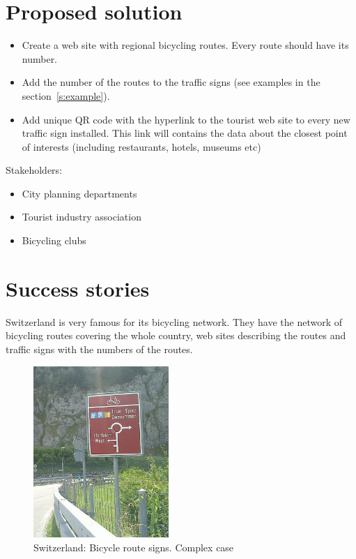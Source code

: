 \documentclass[a4paper]{article}
\begin{document}
\section{Proposed solution}
\begin{itemize}
\item Create a web site with regional bicycling routes. Every route should have its number.
\item Add the number of the routes to the traffic signs (see examples in the section~\ref{s:example}).
\item Add unique QR code with the hyperlink to the tourist web site to every new traffic sign installed. This link will contains the data about the closest point of interests (including
restaurants, hotels, museums etc)
\end{itemize}

Stakeholders:
\begin{itemize}
\item City planning departments
\item Tourist industry association
\item Bicycling clubs
\end{itemize}

\section{Success stories\label{s:example}}
Switzerland is very famous for its bicycling network.  They have the network of bicycling routes covering the whole country, web sites describing the routes and
traffic signs with the numbers of the routes.

\begin{figure}[!h]
\centerline{\includegraphics[keepaspectratio,height=6.5cm]{thun1}}
\caption{Switzerland: Bicycle route signs. Complex case}
\end{figure}
\end{document}

